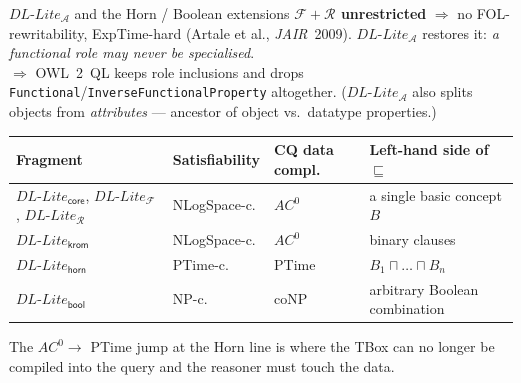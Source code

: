 \documentclass[10pt,aspectratio=169,xcolor=table]{beamer}
\newcommand{\dllite}[1]{\ensuremath{\textit{DL-Lite}_{#1}}}
\newcommand{\sub}{\sqsubseteq}
\begin{document}
\begin{frame}{$\dllite{\mathcal{A}}$ and the Horn / Boolean extensions}
  \small
  \textbf{$\mathcal{F} + \mathcal{R}$ unrestricted} $\Rightarrow$ no FOL-rewritability,
  ExpTime-hard (Artale et al., \emph{JAIR}~2009).
  $\dllite{\mathcal{A}}$ restores it: \emph{a functional role may never be specialised}.
  \\[2pt]
  \footnotesize $\Rightarrow$ OWL~2~QL keeps role inclusions and drops
  \texttt{Functional}/\texttt{InverseFunctionalProperty} altogether.
  ($\dllite{\mathcal{A}}$ also splits objects from \emph{attributes} --- ancestor of
  object vs.\ datatype properties.)
  \vspace{0.6em}

  \centering\footnotesize
  \begin{tabular}{@{}llll@{}}
    \toprule
    \textbf{Fragment} & \textbf{Satisfiability} & \textbf{CQ data compl.} &
    \textbf{Left-hand side of $\sub$}\\
    \midrule
    $\dllite{\mathsf{core}}$, $\dllite{\mathcal{F}}$, $\dllite{\mathcal{R}}$
      & NLogSpace-c. & $AC^0$ & a single basic concept $B$\\
    $\dllite{\mathsf{krom}}$ & NLogSpace-c. & $AC^0$ & binary clauses\\
    \rowcolor{accent!15}
    $\dllite{\mathsf{horn}}$ & PTime-c. & PTime & $B_1 \sqcap \dots \sqcap B_n$\\
    $\dllite{\mathsf{bool}}$ & NP-c. & coNP & arbitrary Boolean combination\\
    \bottomrule
  \end{tabular}

  \vspace{0.5em}
  \raggedright\small
  The $AC^0 \to$ PTime jump at the Horn line is where the TBox can no longer be
  compiled into the query and the reasoner must touch the data.
\end{frame}
\end{document}

